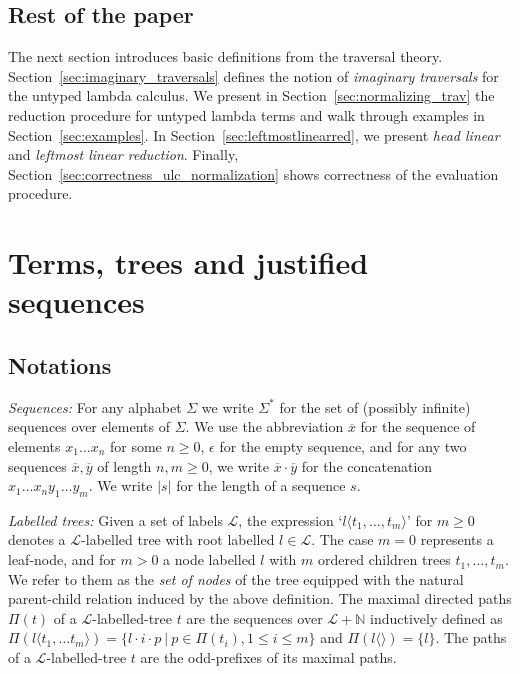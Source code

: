 \documentclass[xchauthor,chkrefs,GCNS,amsmath,amsthm,rotating,leaveRGB]{tcsg}
\theoremstyle{plain}
\theoremstyle{definition}
\begin{document}
\subsection{Rest of the paper}\label{sec1.4}

The next section introduces basic definitions from the traversal theory.
Section~\ref{sec:imaginary_traversals} defines the notion of \emph{imaginary
traversals} for the untyped lambda calculus. We present in
Section~\ref{sec:normalizing_trav} the reduction procedure for untyped lambda
terms and walk through examples in Section~\ref{sec:examples}. In
Section~\ref{sec:leftmostlinearred}, we present \emph{head linear} and
\emph{leftmost linear reduction}. Finally,
Section~\ref{sec:correctness_ulc_normalization} shows correctness of the
evaluation procedure.

\section{Terms, trees and justified sequences}\label{sec:basic_def}

\subsection{Notations}\label{sec2.1}

\emph{Sequences:} For any alphabet $\Sigma $ we write $\Sigma ^{*}$ for the
set of (possibly infinite) sequences over elements of $\Sigma $. We use the
abbreviation $\overline{x}$ for the sequence of elements $x_{1} \ldots x_{n}$
for some $n\geq 0$, $\epsilon $ for the empty sequence, and for any two
sequences $\overline{x}, \overline{y}$ of length $n,m\geq 0$, we write
$\overline{x} \cdot \overline{y}$ for the concatenation $x_{1} \ldots x_{n}
y_{1} \ldots y_{m}$. We write $|s|$ for the length of a sequence $s$.

\emph{Labelled trees:} Given a set of labels $\mathcal{L}$, the expression
`$l\langle t_{1}, \ldots , t_{m} \rangle $' for $m \geq 0$ denotes a
$\mathcal{L}$-labelled tree with root labelled $l\in \mathcal{L}$. The case
$m=0$ represents a leaf-node, and for $m>0$ a node labelled $l$ with $m$
ordered children trees $t_{1}, \ldots , t_{m}$. We refer to them as the
\emph{set of nodes} of the tree equipped with the natural parent-child
relation induced by the above definition. The maximal directed paths $\Pi
(t)$ of a $\mathcal{L}$-labelled-tree $t$ are the sequences over $\mathcal{L}
+ \mathbb {N}$ inductively defined as $\Pi (l \langle t_{1}, \ldots t_{m}
\rangle ) = \{ l \cdot i \cdot p \ |  \ p \in \Pi (t_{i}), 1\leq i \leq m \}$
and $\Pi (l\langle \rangle ) = \{ l \}$. The paths of a
$\mathcal{L}$-labelled-tree $t$ are the odd-prefixes of its maximal paths.
\end{document}
